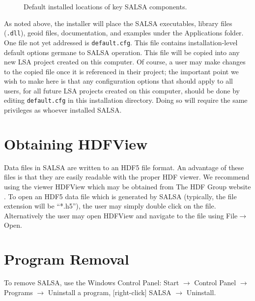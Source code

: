 \begin{figure}[!htbp]

\caption{Default installed locations of key SALSA components.}
\label{fig:InstallLocations}
\end{figure}

As noted above, the installer will place the SALSA executables, library files (\verb+.dll+), geoid files, documentation, and examples under the Applications folder.  One file not yet addressed is \verb+default.cfg+.  This file contains installation-level default options germane to SALSA operation.  This file will be copied into any new LSA project created on this computer.  Of course, a user may make changes to the copied file once it is referenced in their project; the important point we wish to make here is that any configuration options that should apply to all users, for all future LSA projects created on this computer, should be done by editing \verb+default.cfg+ in this installation directory.  Doing so will require the same privileges as whoever installed SALSA.

\section{Obtaining HDFView}
\label{sec:hdfview}

Data files in SALSA are written to an HDF5 file format.  An advantage of these files is that they are easily readable with the proper HDF viewer.  We recommend using the viewer HDFView which may be obtained from The HDF Group website \cite{hdfview}.  To open an HDF5 data file which is generated by SALSA (typically, the file extension will be ``*.h5''), the user may simply double click on the file.  Alternatively the user may open HDFView and navigate to the file using File$\to$Open.

\section{Program Removal}

To remove SALSA, use the Windows Control Panel: Start $\to$ Control Panel $\to$ Programs $\to$ Uninstall a program, [right-click] SALSA $\to$ Uninstall.
